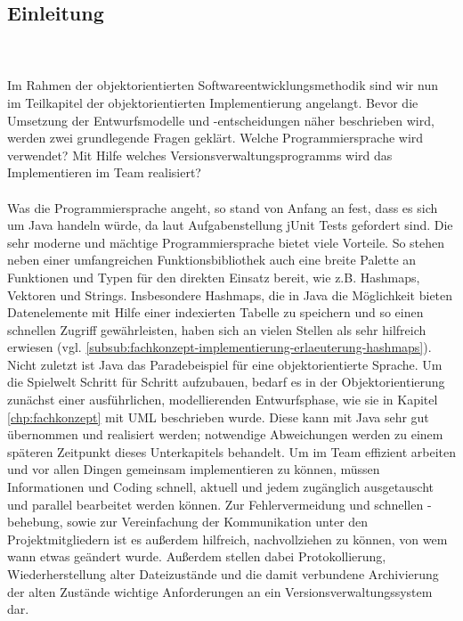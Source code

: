 \subsection{Einleitung}
\label{sub:fachkonzept-implementierung-einleitung}

\\
\\
Im Rahmen der objektorientierten Softwareentwicklungsmethodik sind wir nun im Teilkapitel der objektorientierten Implementierung angelangt. Bevor die Umsetzung der Entwurfsmodelle und -entscheidungen näher beschrieben wird, werden zwei grundlegende Fragen geklärt. Welche Programmiersprache wird verwendet? Mit Hilfe welches Versionsverwaltungsprogramms wird das Implementieren im Team realisiert?
\\
\\
Was die Programmiersprache angeht, so stand von Anfang an fest, dass es sich um Java handeln würde, da laut Aufgabenstellung jUnit Tests gefordert sind. Die sehr moderne und mächtige Programmiersprache bietet viele Vorteile. So stehen neben einer umfangreichen Funktionsbibliothek auch eine breite Palette an Funktionen und Typen für den direkten Einsatz bereit, wie z.B. Hashmaps, Vektoren und Strings. Insbesondere Hashmaps, die in Java die Möglichkeit bieten Datenelemente mit Hilfe einer indexierten Tabelle zu speichern und so einen schnellen Zugriff gewährleisten, haben sich an vielen Stellen als sehr hilfreich erwiesen (vgl. \ref{subsub:fachkonzept-implementierung-erlaeuterung-hashmaps}). 
\\
Nicht zuletzt ist Java das Paradebeispiel für eine objektorientierte Sprache. Um die Spielwelt Schritt für Schritt aufzubauen, bedarf es in der Objektorientierung zunächst einer ausführlichen, modellierenden Entwurfsphase, wie sie in Kapitel \ref{chp:fachkonzept} mit UML beschrieben wurde. Diese kann mit Java sehr gut übernommen und realisiert werden; notwendige Abweichungen werden zu einem späteren Zeitpunkt dieses Unterkapitels behandelt. 
Um im Team effizient arbeiten und vor allen Dingen gemeinsam implementieren zu können, müssen Informationen und Coding schnell, aktuell und jedem zugänglich ausgetauscht und parallel bearbeitet werden können. Zur Fehlervermeidung und schnellen -behebung, sowie zur Vereinfachung der Kommunikation unter den Projektmitgliedern ist es außerdem hilfreich, nachvollziehen zu können, von wem wann etwas geändert wurde. Außerdem stellen dabei Protokollierung, Wiederherstellung alter Dateizustände und die damit verbundene Archivierung der alten Zustände wichtige Anforderungen an ein Versionsverwaltungssystem dar. 
